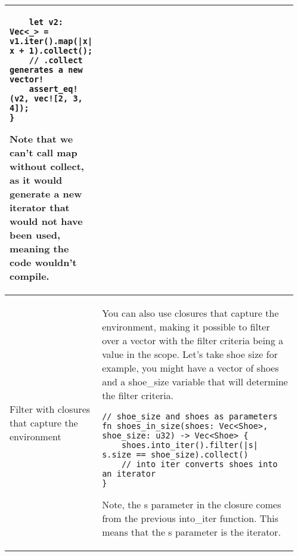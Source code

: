 \documentclass[main.tex,fontsize=8pt,paper=a4,paper=portrait,DIV=calc,]{scrartcl}
\begin{document}
\begin{table}[ht!]
\begin{tabular}{|m{0.2\linewidth}|m{0.755\linewidth}|}
\begin{lstlisting}
    let v2: Vec<_> = v1.iter().map(|x| x + 1).collect();
    // .collect generates a new vector!
    assert_eq!(v2, vec![2, 3, 4]);
}
\end{lstlisting}
\textcolor{OliveGreen}{Note that we can't call map without collect, as it would generate a new iterator that would not have been used, meaning the code wouldn't compile.}\\
\hline
Filter with closures that capture the environment & 
You can also use closures that capture the environment, making it possible to filter over a vector with the filter criteria being a value in the scope.\newline
Let's take shoe size for example, you might have a vector of shoes and a shoe\_size variable that will determine the filter criteria.\newline
\begin{lstlisting}
// shoe_size and shoes as parameters
fn shoes_in_size(shoes: Vec<Shoe>, shoe_size: u32) -> Vec<Shoe> {
    shoes.into_iter().filter(|s| s.size == shoe_size).collect()
    // into iter converts shoes into an iterator
}
\end{lstlisting} 
\textcolor{OliveGreen}{Note, the s parameter in the closure comes from the previous into\_iter function. This means that the s parameter is the iterator.}\\
\hline
\end{tabular}
\end{table}
\pagebreak
\end{document}
